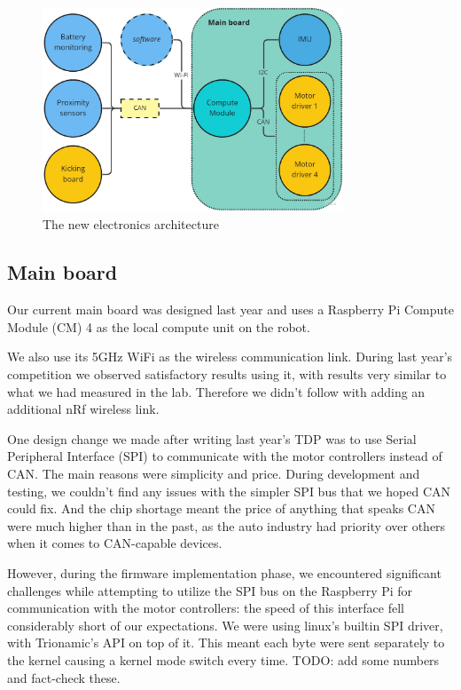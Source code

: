 \documentclass[runningheads]{llncs}
\begin{document}
\begin{figure}
	\centering
	\includegraphics[width=0.8\textwidth]{images/electronics-architecture.jpg}
	\caption{The new electronics architecture}
	\label{fig:electronics-architecture}
\end{figure}

\subsection{Main board}

Our current main board was designed last year and uses a Raspberry Pi Compute Module (CM) 4 as the local compute unit on the robot. 

We also use its 5GHz WiFi as the wireless communication link. During last year's competition we observed satisfactory results using it, with results very similar to what we had measured in the lab. Therefore we didn't follow with adding an additional nRf wireless link.

One design change we made after writing last year's TDP was to use Serial Peripheral Interface (SPI) to communicate with the motor controllers instead of CAN. The main reasons were simplicity and price. During development and testing, we couldn't find any issues with the simpler SPI bus that we hoped CAN could fix. And the chip shortage meant the price of anything that speaks CAN were much higher than in the past, as the auto industry had priority over others when it comes to CAN-capable devices.

However, during the firmware implementation phase, we encountered significant challenges while attempting to utilize the SPI bus on the Raspberry Pi for communication with the motor controllers: the speed of this interface fell considerably short of our expectations. We were using linux's builtin SPI driver, with Trionamic's API on top of it. This meant each byte were sent separately to the kernel causing a kernel mode switch every time. TODO: add some numbers and fact-check these.
\end{document}

